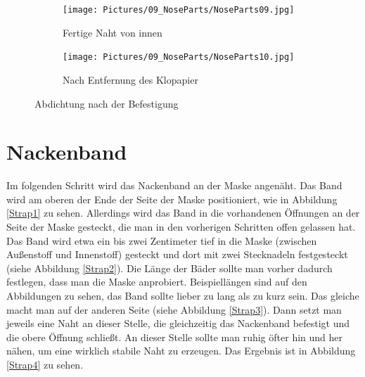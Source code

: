 \documentclass[12pt,parskip=full]{scrartcl}
\begin{document}
\begin{figure}[ht]
    \vspace{0.5cm}
    \centering
    \begin{subfigure}{0.48\textwidth}
        \centering
        \texttt{[image: Pictures/09\_NoseParts/NoseParts09.jpg]}
        \caption{Fertige Naht von innen}
        \label{Nose09}
    \end{subfigure}
    \begin{subfigure}{0.48\textwidth}
        \centering
        \texttt{[image: Pictures/09\_NoseParts/NoseParts10.jpg]}
        \caption{Nach Entfernung des Klopapier}
        \label{Nose10}
    \end{subfigure}
    \caption{Abdichtung nach der Befestigung}
    \label{NoseRes}
\end{figure}

\section{Nackenband}
Im folgenden Schritt wird das Nackenband an der Maske angenäht. Das Band wird am oberen der Ende der Seite der Maske positioniert, wie in Abbildung \ref{Strap1} zu sehen. Allerdings wird das Band in die vorhandenen Öffnungen an der Seite der Maske gesteckt, die man in den vorherigen Schritten offen gelassen hat. Das Band wird etwa ein bis zwei Zentimeter tief in die Maske (zwischen Außenstoff und Innenstoff) gesteckt und dort mit zwei Stecknadeln festgesteckt (siehe Abbildung \ref{Strap2}). Die Länge der Bäder sollte man vorher dadurch festlegen, dass man die Maske anprobiert. Beispiellängen sind auf den Abbildungen zu sehen, das Band sollte lieber zu lang als zu kurz sein. Das gleiche macht man auf der anderen Seite (siehe Abbildung \ref{Strap3}). Dann setzt man jeweils eine Naht an dieser Stelle, die gleichzeitig das Nackenband befestigt und die obere Öffnung schließt. An dieser Stelle sollte man ruhig öfter hin und her nähen, um eine wirklich stabile Naht zu erzeugen. Das Ergebnis ist in Abbildung \ref{Strap4} zu sehen. 
\end{document}
